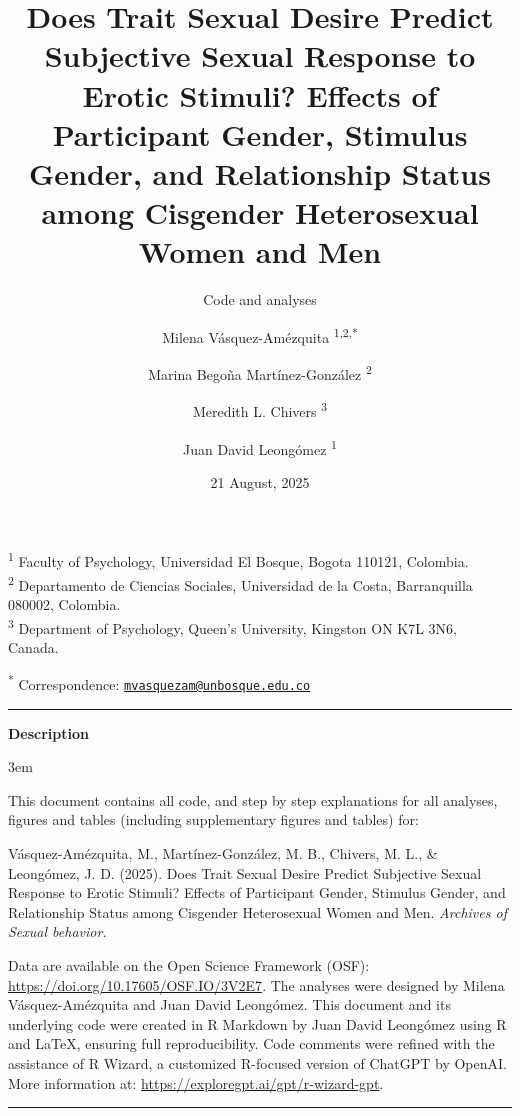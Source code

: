 \documentclass[
  bookmarksnumbered]{article}
\title{Does Trait Sexual Desire Predict Subjective Sexual Response to Erotic Stimuli? Effects of Participant Gender, Stimulus Gender, and Relationship Status among Cisgender Heterosexual Women and Men}
\subtitle{Code and analyses}
\author{Milena Vásquez-Amézquita \orcidlink{0000-0001-7317-8430}\textsuperscript{1,2,*} \and Marina Begoña Martínez-González \orcidlink{0000-0002-5840-6383}\textsuperscript{2} \and Meredith L. Chivers \orcidlink{0000-0002-5495-9263}\textsuperscript{3} \and Juan David Leongómez \orcidlink{0000-0002-0092-6298}\textsuperscript{1}}
\date{21 August, 2025}
\begin{document}
\maketitle

\textsuperscript{1} Faculty of Psychology, Universidad El Bosque, Bogota 110121, Colombia.\\
\textsuperscript{2} Departamento de Ciencias Sociales, Universidad de la Costa, Barranquilla 080002, Colombia.\\
\textsuperscript{3} Department of Psychology, Queen's University, Kingston ON K7L 3N6, Canada.

\textsuperscript{*} Correspondence: \href{mailto:mvasquezam@unbosque.edu.co}{\href{mailto:mvasquezam@unbosque.edu.co}{\nolinkurl{mvasquezam@unbosque.edu.co}}}

\begin{center}\rule{0.5\linewidth}{0.5pt}\end{center}

\begin{center}
\textbf{Description}
\end{center}

\par
\begingroup
\leftskip3em
\rightskip\leftskip

This document contains all code, and step by step explanations for all analyses, figures and tables (including supplementary figures and tables) for:

\begin{hangparas}{.25in}{1}
Vásquez-Amézquita, M., Martínez-González, M. B., Chivers, M. L., \& Leongómez, J. D. (2025). Does Trait Sexual Desire Predict Subjective Sexual Response to Erotic Stimuli? Effects of Participant Gender, Stimulus Gender, and Relationship Status among Cisgender Heterosexual Women and Men. \textit{Archives of Sexual behavior.}
\end{hangparas}

Data are available on the Open Science Framework (OSF): \url{https://doi.org/10.17605/OSF.IO/3V2E7}. The analyses were designed by Milena Vásquez-Amézquita and Juan David Leongómez. This document and its underlying code were created in R Markdown by Juan David Leongómez using R and \LaTeX, ensuring full reproducibility. Code comments were refined with the assistance of R Wizard, a customized R-focused version of ChatGPT by OpenAI. More information at: \url{https://exploregpt.ai/gpt/r-wizard-gpt}.

\begin{center}\rule{0.5\linewidth}{0.5pt}\end{center}
\end{document}
